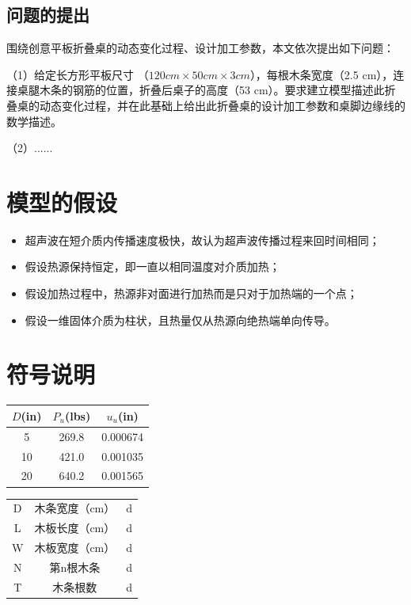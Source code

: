 \documentclass[fontset=windows]{whutmod}
\begin{document}
\subsection{问题的提出}

围绕创意平板折叠桌的动态变化过程、设计加工参数，本文依次提出如下问题：

（1）给定长方形平板尺寸 （$120 cm \times 50 cm \times 3 cm$），每根木条宽度（2.5 cm），连接桌腿木条的钢筋的位置，折叠后桌子的高度（53 cm）。要求建立模型描述此折叠桌的动态变化过程，并在此基础上给出此折叠桌的设计加工参数和桌脚边缘线的数学描述。

（2）......

\newpage
\section{模型的假设}

\begin{itemize}
	
	\item 超声波在短介质内传播速度极快，故认为超声波传播过程来回时间相同；
	\item 假设热源保持恒定，即一直以相同温度对介质加热；
	\item 假设加热过程中，热源非对面进行加热而是只对于加热端的一个点；
	\item 假设一维固体介质为柱状，且热量仅从热源向绝热端单向传导。
\end{itemize}

\section{符号说明}

\begin{center}
	\begin{tabular}{ccc}
		\toprule[1.5pt]
		$D$(in) & $P_u$(lbs) & $u_u$(in) \\
		\midrule[1pt]
		5 & 269.8 & 0.000674 \\
		10 & 421.0 & 0.001035 \\
		20 & 640.2 & 0.001565\\
		\bottomrule[1.5pt]
	\end{tabular}
\end{center}

\begin{center}
	\begin{tabular}{ccc}
		\toprule[1.5pt]
		\makebox[0.2\textwidth][c]{符号}	&  \makebox[0.3\textwidth][c]{意义} &
		\makebox[0.2\textwidth][c]{单位}\\ 
		\midrule[1pt]
		D	    & 木条宽度（cm） &d\\ 
		L	    & 木板长度（cm） &d\\ 
		W	    & 木板宽度（cm） &d\\ 
		N	    & 第n根木条  &d\\ 
		T	    & 木条根数  &d\\ 
		\bottomrule[1.5pt]
	\end{tabular}
\end{center}
\end{document}
